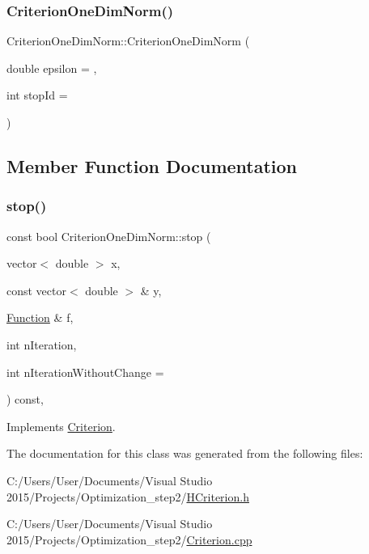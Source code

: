 \subsubsection{\texorpdfstring{Criterion\+One\+Dim\+Norm()}{CriterionOneDimNorm()}}
{\footnotesize\ttfamily Criterion\+One\+Dim\+Norm\+::\+Criterion\+One\+Dim\+Norm (\begin{DoxyParamCaption}\item[{double}]{epsilon = {},  }\item[{int}]{stop\+Id = {} }\end{DoxyParamCaption})\hspace{0.3cm}{\ttfamily [inline]}}



\subsection{Member Function Documentation}
\mbox{\label{class_criterion_one_dim_norm_a34169be5a51a1146f087858cc9716be7}} 
\subsubsection{\texorpdfstring{stop()}{stop()}}
{\footnotesize\ttfamily const bool Criterion\+One\+Dim\+Norm\+::stop (\begin{DoxyParamCaption}\item[{vector$<$ double $>$}]{x,  }\item[{const vector$<$ double $>$ \&}]{y,  }\item[{\hyperlink{class_function}{Function} \&}]{f,  }\item[{int}]{n\+Iteration,  }\item[{int}]{n\+Iteration\+Without\+Change = {} }\end{DoxyParamCaption}) const\hspace{0.3cm}{\ttfamily [override]}, {\ttfamily [virtual]}}



Implements \hyperlink{class_criterion_aee3e2148c665c72c50c2f870a3ca8cdc}{Criterion}.



The documentation for this class was generated from the following files\+:\begin{DoxyCompactItemize}
\item 
C\+:/\+Users/\+User/\+Documents/\+Visual Studio 2015/\+Projects/\+Optimization\+\_\+step2/\hyperlink{_h_criterion_8h}{H\+Criterion.\+h}\item 
C\+:/\+Users/\+User/\+Documents/\+Visual Studio 2015/\+Projects/\+Optimization\+\_\+step2/\hyperlink{_criterion_8cpp}{Criterion.\+cpp}\end{DoxyCompactItemize}
